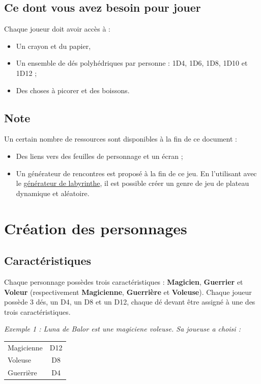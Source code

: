 \documentclass[a4paper, 11pt, twoside]{article}
\begin{document}
\subsection{Ce dont vous avez besoin pour jouer}
\label{sec:orgf3aa2eb}

Chaque joueur doit avoir accès à :
\begin{itemize}
\item Un crayon et du papier,
\item Un ensemble de dés polyhédriques par personne : 1D4, 1D6, 1D8, 1D10 et 1D12 ;
\item Des choses à picorer et des boissons.
\end{itemize}

\subsection{Note}
\label{sec:orgacb6df8}

Un certain nombre de ressources sont disponibles à la fin de ce document :
\begin{itemize}
\item Des liens vers des feuilles de personnage et un écran ;
\item Un générateur de rencontres est proposé à la fin de ce jeu. En l'utilisant avec le \href{https://github.com/orey/jdr/tree/master/G\%25C3\%25A9n\%25C3\%25A9rateurLabyrinthe}{générateur de labyrinthe}, il est possible créer un genre de jeu de plateau dynamique et aléatoire.
\end{itemize}

\section{Création des personnages}
\label{sec:org3774562}
\subsection{Caractéristiques}
\label{sec:org884be30}

Chaque personnage possèdes trois caractéristiques : \textbf{Magicien}, \textbf{Guerrier} et \textbf{Voleur} (respectivement \textbf{Magicienne}, \textbf{Guerrière} et \textbf{Voleuse}). Chaque joueur possède 3 dés, un D4, un D8 et un D12, chaque dé devant être assigné à une des trois caractéristiques. 

\emph{Exemple 1 : Luna de Balor est une magiciene voleuse. Sa joueuse a choisi :}

\begin{longtable}{l|c}
\hline
Magicienne & D12\\
Voleuse & D8\\
Guerrière & D4\\
\end{longtable}
\end{document}
